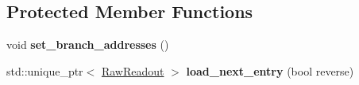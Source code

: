\subsection*{Protected Member Functions}
\begin{DoxyCompactItemize}
\item 
\hypertarget{classannie_1_1RawReader_aa097eb3c009619f29f7fc2134016b275}{
void {\bfseries set\_\-branch\_\-addresses} ()}
\label{classannie_1_1RawReader_aa097eb3c009619f29f7fc2134016b275}

\item 
\hypertarget{classannie_1_1RawReader_aafa30153f901063d8294fd9a76bf5058}{
std::unique\_\-ptr$<$ \hyperlink{classannie_1_1RawReadout}{RawReadout} $>$ {\bfseries load\_\-next\_\-entry} (bool reverse)}
\label{classannie_1_1RawReader_aafa30153f901063d8294fd9a76bf5058}

\end{DoxyCompactItemize}
